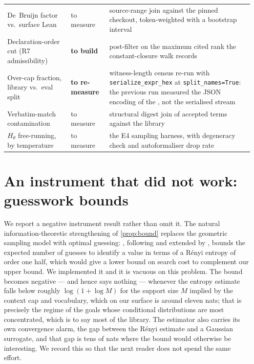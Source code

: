 \begin{table}[t]
\begin{tabular}{p{} p{} p{}}
De~Bruijn factor vs.\ surface Lean & to measure & source-range join against the pinned checkout, token-weighted with a bootstrap interval \\
Declaration-order cut (R7 admissibility) & \textbf{to build} & post-filter on the maximum cited rank the constant-closure walk records \\
Over-cap fraction, library vs.\ eval split & \textbf{to re-measure} & witness-length census re-run with \texttt{serialize\_expr\_hex} at \texttt{split\_names=True}: the previous run measured the JSON encoding of the \Expr{}, not the serialised stream \\
Verbatim-match contamination & to measure & structural digest join of accepted terms against the library \\
\(H_\theta\) free-running, by temperature & to measure & the E4 sampling harness, with degeneracy check and autoformaliser drop rate \\
\bottomrule
\end{tabular}
\end{table}

\section{An instrument that did not work: guesswork bounds}
\label{app:guesswork}

We report a negative instrument result rather than omit it.
The natural information-theoretic strengthening of \cref{prop:bound} replaces
the geometric sampling model with optimal guessing:
\citet{arikan1996guessing}, following \citet{massey1994guessing} and extended by
\citet{sundaresan2007guessing}, bounds the expected number of guesses to
identify a value in terms of a R\'enyi entropy of order one half, which would
give a lower bound on search cost to complement our upper bound.
We implemented it and it is vacuous on this problem.
The bound becomes negative --- and hence says nothing --- whenever the entropy
estimate falls below roughly \(\log(1+\log M)\) for the support size \(M\)
implied by the context cap and vocabulary, which on our surface is around eleven
nats;
that is precisely the regime of the goals whose conditional distributions are
most concentrated, which is to say most of the library.
The estimator also carries its own convergence alarm, the gap between the
R\'enyi estimate and a Gaussian surrogate, and that gap is tens of nats where
the bound would otherwise be interesting.
We record this so that the next reader does not spend the same effort.
